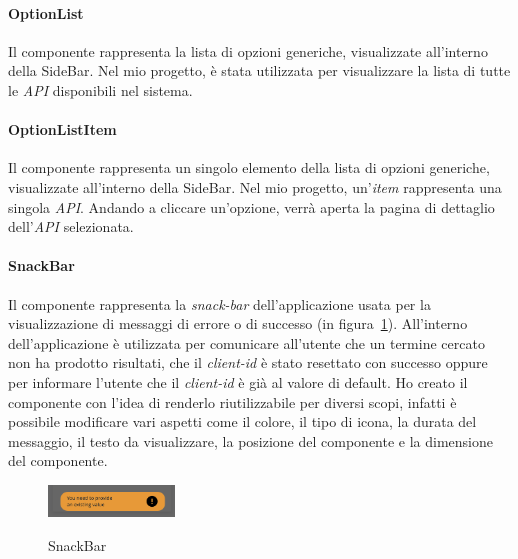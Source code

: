 \paragraph{OptionList}\label{par:option-list}
Il componente rappresenta la lista di opzioni generiche, visualizzate all'interno della SideBar. Nel mio progetto, è stata utilizzata per visualizzare la lista
di tutte le \textit{API} disponibili nel sistema. 

\paragraph{OptionListItem}\label{par:option-list-item}
Il componente rappresenta un singolo elemento della lista di opzioni generiche, visualizzate all'interno della SideBar. Nel mio progetto, un'\textit{item} rappresenta una singola \textit{API}.
Andando a cliccare un'opzione, verrà aperta la pagina di dettaglio dell'\textit{API} selezionata.

\paragraph{SnackBar}\label{par:snack-bar}
Il componente rappresenta la \textit{snack-bar} dell'applicazione usata per la visualizzazione di messaggi di errore o di successo (in figura~\ref{fig:snack-bar}).
All'interno dell'applicazione è utilizzata per comunicare all'utente che un termine cercato non ha prodotto risultati,  che il \textit{client-id} è stato resettato con successo
oppure per informare l'utente che il \textit{client-id} è già al valore di default.
Ho creato il componente con l'idea di renderlo riutilizzabile per diversi scopi, infatti è possibile modificare vari aspetti come il colore, il tipo di icona,
la durata del messaggio, il testo da visualizzare, la posizione del componente e la dimensione del componente.

\begin{figure}[ht]
  \centering
  \includegraphics[width=0.3\textwidth, alt={Snackbar di errore}]{images/frontend/SnackBar1.jpg}
  \caption{SnackBar}\label{fig:snack-bar}
\end{figure}

